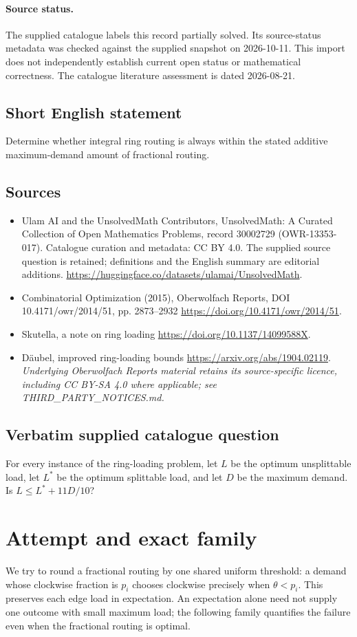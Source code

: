\documentclass[11pt]{article}
\begin{document}
\paragraph{Source status.}
The supplied catalogue labels this record partially solved. Its source-status metadata was checked against the supplied snapshot on 2026-10-11. This import does not independently establish current open status or mathematical correctness. The catalogue literature assessment is dated 2026-08-21.
\subsection{Short English statement}
Determine whether integral ring routing is always within the stated additive maximum-demand amount of fractional routing.
\subsection{Sources}
\begin{itemize}
\item[S1] Ulam AI and the UnsolvedMath Contributors, UnsolvedMath: A Curated Collection of Open Mathematics Problems, record 30002729 (OWR-13353-017). Catalogue curation and metadata: CC BY 4.0. The supplied source question is retained; definitions and the English summary are editorial additions.
\url{https://huggingface.co/datasets/ulamai/UnsolvedMath}.
\item[S2] Combinatorial Optimization (2015), Oberwolfach Reports, DOI 10.4171/owr/2014/51, pp. 2873--2932
\url{https://doi.org/10.4171/owr/2014/51}.
\item[S3] Skutella, a note on ring loading
\url{https://doi.org/10.1137/14099588X}.
\item[S4] Däubel, improved ring-loading bounds
\url{https://arxiv.org/abs/1904.02119}.
\textit{Underlying Oberwolfach Reports material retains its source-specific licence, including CC BY-SA 4.0 where applicable; see THIRD\_PARTY\_NOTICES.md.}
\end{itemize}
\subsection{Verbatim supplied catalogue question}
For every instance of the ring-loading problem, let $L$ be the optimum unsplittable load, let $L^*$ be the optimum splittable load, and let $D$ be the maximum demand. Is $L\leq L^*+11D/10$?

\section{Attempt and exact family}
We try to round a fractional routing by one shared uniform threshold: a demand
whose clockwise fraction is $p_i$ chooses clockwise precisely when $\theta<p_i$.
This preserves each edge load in expectation. An expectation alone need not
supply one outcome with small maximum load; the following family quantifies
the failure even when the fractional routing is optimal.
\end{document}
